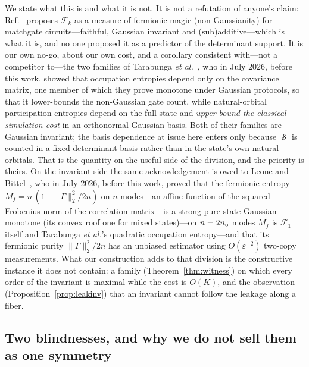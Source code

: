We state what this is and what it is not. It is not a refutation of anyone's claim:
Ref.~\cite{sierant2026} proposes $\mathcal F_k$ as a measure of fermionic magic (non-Gaussianity) for
matchgate circuits---faithful, Gaussian invariant and (sub)additive---which is what it is, and no one
proposed it as a predictor of the determinant support. It is our own
no-go, about our own cost, and a corollary consistent with---not a competitor to---the two families of
Tarabunga \emph{et al.}~\cite{tarabunga2026}, who in July 2026, before this work, showed that
occupation entropies depend only on the covariance matrix, one member of which they prove monotone
under Gaussian protocols, so that it lower-bounds the non-Gaussian gate count,
while natural-orbital participation entropies depend on the full state and \emph{upper-bound the
classical simulation cost} in an orthonormal Gaussian basis. Both of their families are Gaussian
invariant; the basis dependence at issue here enters only because $|\mathcal S|$ is counted in a fixed
determinant basis rather than in the state's own natural orbitals. That is the quantity on the useful
side of the division, and the priority is theirs. On the invariant side the same acknowledgement is owed
to Leone and Bittel~\cite{leonebittel2026}, who in July 2026, before this work, proved that the
fermionic entropy $M_f=n\,(1-\|\Gamma\|_2^2/2n)$ on $n$ modes---an affine function of the squared
Frobenius norm of the correlation matrix---is a strong pure-state Gaussian monotone (its convex roof one for mixed states)---on $n=2n_{\rm o}$ modes
$M_f$ is $\mathcal F_1$ itself and Tarabunga \emph{et al.}'s quadratic occupation entropy---and that its
fermionic purity $\|\Gamma\|_2^2/2n$ has an unbiased estimator using $O(\varepsilon^{-2})$ two-copy
measurements.
What our construction adds to that division is the constructive instance it does not
contain: a family (Theorem~\ref{thm:witness}) on which every order of the invariant is maximal while the
%
%
cost is $O(K)$, and the observation (Proposition~\ref{prop:leakinv}) that an invariant cannot follow
the leakage along a fiber.

\subsection{Two blindnesses, and why we do not sell them as one symmetry}
\label{sec:nogo:asym}

